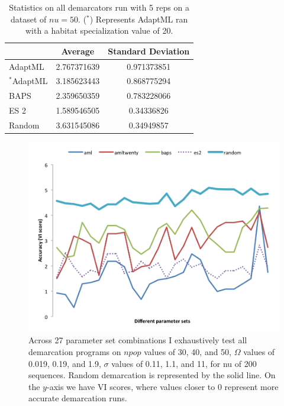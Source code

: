 \begin{table}
    \begin{tabular}{l|cc}
    ~                    & Average     & Standard Deviation \\ \hline
    AdaptML              & 2.767371639 & 0.971373851        \\
    $^\ast$AdaptML              & 3.185623443 & 0.868775294        \\
    BAPS                 & 2.359650359 & 0.783228066        \\
    ES 2 & 1.589546505 & 0.34336826         \\
    Random               & 3.631545086 & 0.34949857         \\
    \end{tabular}
    \caption[Statistics on all demarcators on $nu=50$.]{Statistics on all demarcators run with 5 reps on a dataset of $nu=50$. ($^\ast$) Represents AdaptML ran with a habitat specialization value of 20.}
        \label{tab:50Allmean}
\end{table}

\begin{figure}[h!]
  \centering
    \includegraphics[scale=0.75]{images/ResultGraphs/ResultGraphs-1}
      \caption[All demarcation graphical accuracy visualization on $nu = 200$.]{Across 27 parameter set combinations I exhaustively test all demarcation programs on $npop$ values of 30, 40, and 50, $\Omega$ values of 0.019, 0.19, and 1.9, $\sigma$ values of 0.11, 1.1, and 11, for nu of 200 sequences. Random demarcation is represented by the solid line. On the $y$-axis we have VI scores, where values closer to 0 represent more accurate demarcation runs.}
    \label{fig:All200}
\end{figure}

